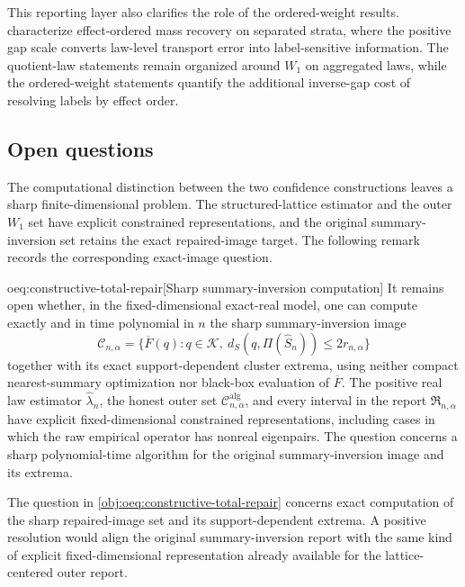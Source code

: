 \documentclass[11pt]{article}
\begin{document}
This reporting layer also clarifies the role of the ordered-weight results.  characterize effect-ordered mass recovery on separated strata, where the positive gap scale converts law-level transport error into label-sensitive information. The quotient-law statements remain organized around \(W_1\) on aggregated laws, while the ordered-weight statements quantify the additional inverse-gap cost of resolving labels by effect order.

\subsection{Open questions}

The computational distinction between the two confidence constructions leaves a sharp finite-dimensional problem. The structured-lattice estimator and the outer \(W_1\) set have explicit constrained representations, and the original summary-inversion set retains the exact repaired-image target. The following remark records the corresponding exact-image question.

\begin{remarkv}{oeq:constructive-total-repair}[Sharp summary-inversion computation]
It remains open whether, in the fixed-dimensional exact-real model, one can compute exactly and in time polynomial in \(n\) the sharp summary-inversion image
\[
\mathcal C_{n,\alpha}
=
\{\overline F(q):q\in\mathcal K,\ d_S(q,\Pi(\widehat S_n))\le 2r_{n,\alpha}\}
\]
together with its exact support-dependent cluster extrema, using neither compact nearest-summary optimization nor black-box evaluation of \(\overline F\). The positive real law estimator \(\widehat\lambda_n\), the honest outer set \(\mathcal C^{\mathrm{alg}}_{n,\alpha}\), and every interval in the report \(\mathfrak R_{n,\alpha}\) have explicit fixed-dimensional constrained representations, including cases in which the raw empirical operator has nonreal eigenpairs. The question concerns a sharp polynomial-time algorithm for the original summary-inversion image and its extrema.
\end{remarkv}

The question in \cref{obj:oeq:constructive-total-repair} concerns exact computation of the sharp repaired-image set and its support-dependent extrema. A positive resolution would align the original summary-inversion report with the same kind of explicit fixed-dimensional representation already available for the lattice-centered outer report.
\end{document}
